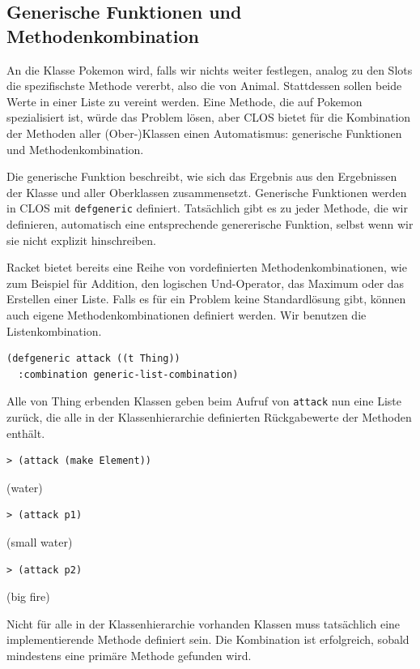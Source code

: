 \subsection{Generische Funktionen und Methodenkombination}
An die Klasse Pokemon wird, falls wir nichts weiter festlegen, analog zu den Slots die spezifischste Methode vererbt, also die von Animal. Stattdessen sollen beide Werte in einer Liste zu vereint werden. Eine Methode, die auf Pokemon spezialisiert ist, würde das Problem lösen, aber CLOS bietet für die Kombination der Methoden aller (Ober-)Klassen einen Automatismus: generische Funktionen und Methodenkombination. 

Die generische Funktion beschreibt, wie sich das Ergebnis aus den Ergebnissen der Klasse und aller Oberklassen zusammensetzt. Generische Funktionen werden in CLOS mit \texttt{defgeneric} definiert. Tatsächlich gibt es zu jeder Methode, die wir definieren, automatisch eine entsprechende genererische Funktion, selbst wenn wir sie nicht explizit hinschreiben. 

Racket bietet bereits eine Reihe von vordefinierten Methodenkombinationen, wie zum Beispiel für Addition, den logischen Und-Operator, das Maximum oder das Erstellen einer Liste. Falls es für ein Problem keine Standardlösung gibt, können auch eigene Methodenkombinationen definiert werden. Wir benutzen die Listenkombination.

\begin{lstlisting}
(defgeneric attack ((t Thing))
  :combination generic-list-combination)
\end{lstlisting}

Alle von Thing erbenden Klassen geben beim Aufruf von \texttt{attack} nun eine Liste zurück, die alle in der Klassenhierarchie definierten Rückgabewerte der Methoden enthält.

\begin{lstlisting}
> (attack (make Element))
\end{lstlisting}
{\rsymbol (water)}

\begin{lstlisting}
> (attack p1)
\end{lstlisting}
{\rsymbol (small water)}

\begin{lstlisting}
> (attack p2)
\end{lstlisting}
{\rsymbol (big fire)}

Nicht für alle in der Klassenhierarchie vorhanden Klassen muss tatsächlich eine implementierende Methode definiert sein. Die Kombination ist erfolgreich, sobald mindestens eine primäre Methode gefunden wird.

